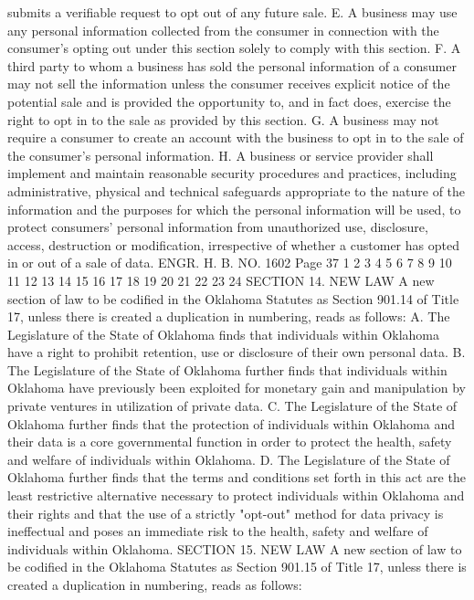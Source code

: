 submits a verifiable request to opt out of any future sale.
E. A business may use any personal information collected from
the consumer in connection with the consumer's opting out under this
section solely to comply with this section.
F. A third party to whom a business has sold the personal
information of a consumer may not sell the information unless the
consumer receives explicit notice of the potential sale and is
provided the opportunity to, and in fact does, exercise the right to
opt in to the sale as provided by this section.
G. A business may not require a consumer to create an account
with the business to opt in to the sale of the consumer's personal
information.
H. A business or service provider shall implement and maintain
reasonable security procedures and practices, including
administrative, physical and technical safeguards appropriate to the
nature of the information and the purposes for which the personal
information will be used, to protect consumers' personal information
from unauthorized use, disclosure, access, destruction or
modification, irrespective of whether a customer has opted in or out
of a sale of data.
ENGR. H. B. NO. 1602 Page 37
1
2
3
4
5
6
7
8
9
10
11
12
13
14
15
16
17
18
19
20
21
22
23
24
SECTION 14. NEW LAW A new section of law to be codified
in the Oklahoma Statutes as Section 901.14 of Title 17, unless there
is created a duplication in numbering, reads as follows:
A. The Legislature of the State of Oklahoma finds that
individuals within Oklahoma have a right to prohibit retention, use
or disclosure of their own personal data.
B. The Legislature of the State of Oklahoma further finds that
individuals within Oklahoma have previously been exploited for
monetary gain and manipulation by private ventures in utilization of
private data.
C. The Legislature of the State of Oklahoma further finds that
the protection of individuals within Oklahoma and their data is a
core governmental function in order to protect the health, safety
and welfare of individuals within Oklahoma.
D. The Legislature of the State of Oklahoma further finds that
the terms and conditions set forth in this act are the least
restrictive alternative necessary to protect individuals within
Oklahoma and their rights and that the use of a strictly "opt-out"
method for data privacy is ineffectual and poses an immediate risk
to the health, safety and welfare of individuals within Oklahoma.
SECTION 15. NEW LAW A new section of law to be codified
in the Oklahoma Statutes as Section 901.15 of Title 17, unless there
is created a duplication in numbering, reads as follows:

